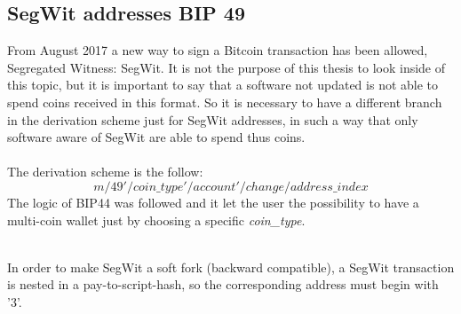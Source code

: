 \subsection{SegWit addresses BIP 49}
From August 2017 a new way to sign a Bitcoin transaction has been allowed, Segregated Witness: SegWit. It is not the purpose of this thesis to look inside of this topic, but it is important to say that a software not updated is not able to spend coins received in this format. So it is necessary to have a different branch in the derivation scheme just for SegWit addresses, in such a way that only software aware of SegWit are able to spend thus coins.
\\ \\
The derivation scheme is the follow:
\begin{equation*}
m / 49' / coin\_type' / account' / change / address\_index
\end{equation*}
The logic of BIP44 was followed and it let the user the possibility to have a multi-coin wallet just by choosing a specific \textit{coin\_type}.
\\ \\
\begin{remark}
	In order to make SegWit a soft fork (backward compatible), a SegWit transaction is nested in a pay-to-script-hash, so the corresponding address must begin with '3'.	
\end{remark}




